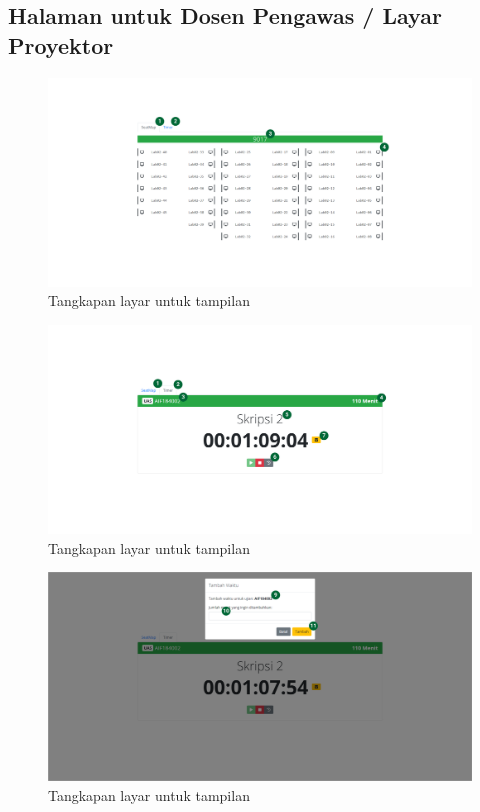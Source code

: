     \subsection{Halaman untuk Dosen Pengawas / Layar Proyektor}
    \begin{figure}
        \centering
        \includegraphics{Gambar/implemented-interface/pengawas/seatmap.png}
        \caption{Tangkapan layar untuk tampilan }
        \label{fig:screenshot-pengawas-seatmap}
    \end{figure}
    \begin{figure}
        \centering
        \includegraphics{Gambar/implemented-interface/pengawas/timer.png}
        \caption{Tangkapan layar untuk tampilan }
        \label{fig:screenshot-pengawas-timer}
    \end{figure}
    \begin{figure}
        \centering
        \includegraphics{Gambar/implemented-interface/pengawas/overtime.png}
        \caption{Tangkapan layar untuk tampilan }
        \label{fig:screenshot-pengawas-overtime}
    \end{figure}
